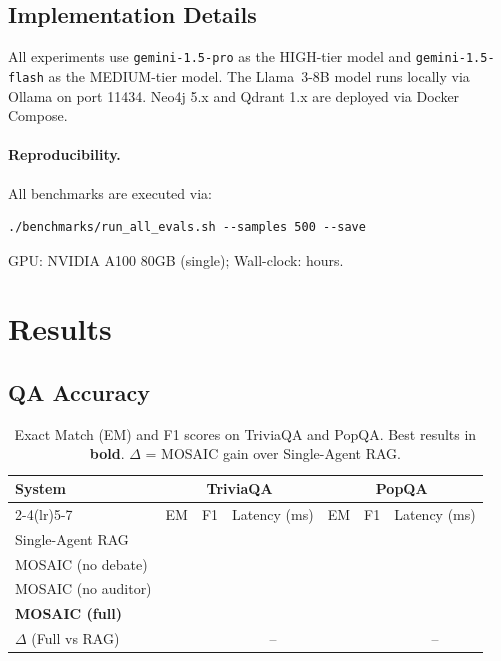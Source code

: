 \documentclass{article}
\begin{document}
\subsection{Implementation Details}

All experiments use \texttt{gemini-1.5-pro} as the HIGH-tier model and
\texttt{gemini-1.5-flash} as the MEDIUM-tier model.  The Llama~3-8B model
runs locally via Ollama on port 11434.  Neo4j 5.x and Qdrant 1.x are deployed
via Docker Compose.

\paragraph{Reproducibility.}
All benchmarks are executed via:
\begin{verbatim}
./benchmarks/run_all_evals.sh --samples 500 --save
\end{verbatim}
GPU: NVIDIA A100 80GB (single); Wall-clock:  hours.



\section{Results}
\label{sec:results}

\subsection{QA Accuracy}

\begin{table}[ht]
  \centering
  \caption{Exact Match (EM) and F1 scores on TriviaQA and PopQA.
    Best results in \textbf{bold}. $\Delta$ = MOSAIC gain over Single-Agent RAG.}
  \label{tab:accuracy}
  \begin{tabular}{lcccccc}
    \toprule
    \multirow{2}{*}{System} &
      \multicolumn{3}{c}{TriviaQA} &
      \multicolumn{3}{c}{PopQA} \\
    \cmidrule(lr){2-4}\cmidrule(lr){5-7}
    & EM & F1 & Latency (ms) & EM & F1 & Latency (ms) \\
    \midrule
    Single-Agent RAG        & \todo{--} & \todo{--} & \todo{--} & \todo{--} & \todo{--} & \todo{--} \\
    MOSAIC (no debate)      & \todo{--} & \todo{--} & \todo{--} & \todo{--} & \todo{--} & \todo{--} \\
    MOSAIC (no auditor)     & \todo{--} & \todo{--} & \todo{--} & \todo{--} & \todo{--} & \todo{--} \\
    \textbf{MOSAIC (full)}  & \textbf{\todo{--}} & \textbf{\todo{--}} & \todo{--}
                             & \textbf{\todo{--}} & \textbf{\todo{--}} & \todo{--} \\
    \midrule
    $\Delta$ (Full vs RAG)  & \todo{+} & \todo{+} & -- & \todo{+} & \todo{+} & -- \\
    \bottomrule
  \end{tabular}
\end{table}
\end{document}
